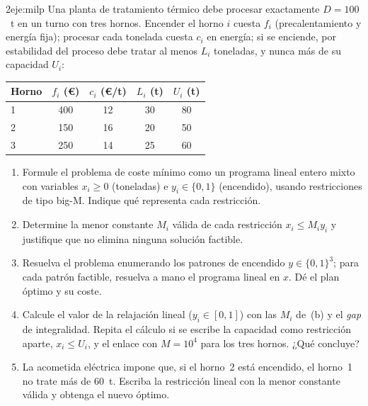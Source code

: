 \begin{ejercicio}{2}{eje:milp}
Una planta de tratamiento térmico debe procesar exactamente $D=100$~t en un turno con tres hornos. Encender el horno $i$ cuesta $f_i$ (precalentamiento y energía fija); procesar cada tonelada cuesta $c_i$ en energía; si se enciende, por estabilidad del proceso debe tratar al menos $L_i$ toneladas, y nunca más de su capacidad $U_i$:
\begin{center}\small
\begin{tabular}{@{}lcccc@{}}
\toprule
Horno & $f_i$ (€) & $c_i$ (€/t) & $L_i$ (t) & $U_i$ (t) \\
\midrule
1 & 400 & 12 & 30 & 80 \\
2 & 150 & 16 & 20 & 50 \\
3 & 250 & 14 & 25 & 60 \\
\bottomrule
\end{tabular}
\end{center}
\begin{enumerate}[label=(\alph*)]
  \item {} Formule el problema de coste mínimo como un programa lineal entero mixto con variables $x_i\ge 0$ (toneladas) e $y_i\in\{0,1\}$ (encendido), usando restricciones de tipo big-M. Indique qué representa cada restricción.
  \item {} Determine la menor constante $M_i$ válida de cada restricción $x_i\le M_iy_i$ y justifique que no elimina ninguna solución factible.
  \item {} Resuelva el problema enumerando los patrones de encendido $y\in\{0,1\}^{3}$; para cada patrón factible, resuelva a mano el programa lineal en $x$. Dé el plan óptimo y su coste.
  \item {} Calcule el valor de la relajación lineal ($y_i\in[0,1]$) con las $M_i$ de~(b) y el \emph{gap} de integralidad. Repita el cálculo si se escribe la capacidad como restricción aparte, $x_i\le U_i$, y el enlace con $M=10^{4}$ para los tres hornos. ¿Qué concluye?
  \item {} La acometida eléctrica impone que, si el horno~2 está encendido, el horno~1 no trate más de 60~t. Escriba la restricción lineal con la menor constante válida y obtenga el nuevo óptimo.
\end{enumerate}
\end{ejercicio}

